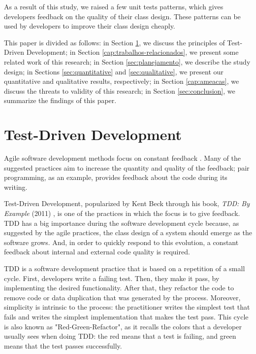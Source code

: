 \documentclass[times]{elsarticle}
\begin{document}
As a result of this study, we raised a few unit tests patterns, which gives developers
feedback on the quality of their class design. These patterns can be used by developers
to improve their class design cheaply.

This paper is divided as follows: in Section \ref{sec:tdd}, we discuss the principles
of Test-Driven Development; in Section \ref{cap:trabalhos-relacionados}, we present
some related work of this research; in Section \ref{sec:planejamento}, we describe the
study design; in Sections \ref{sec:quantitative} and \ref{sec:qualitative}, we present
our quantitative and qualitative results, respectively; in Section \ref{cap:ameacas},
we discuss the threats to validity of this research; in Section \ref{sec:conclusion},
we summarize the findings of this paper.


\section{Test-Driven Development}
\label{sec:tdd}

Agile software development methods focus on constant feedback \cite{AgileManifesto}. 
Many of the suggested practices
aim to increase the quantity and quality of the feedback; pair programming,
as an example, provides feedback about the code during its writing.

Test-Driven Development, popularized by Kent Beck through his book, \textit{TDD: By Example} (2011)
\cite{TDDByExample}, is one of the practices in which the focus is to give feedback. TDD has
a big importance during the software development cycle because, as suggested by the agile
practices, the class design of a system should emerge as the software grows. And, in order
to quickly respond to this evolution, a constant feedback about internal and external code
quality is required.

TDD is a software development practice that is based on a repetition of a small
cycle. First, developers write a failing test. Then, they make it pass,
by implementing the desired functionality. After that, they refactor the code
to remove code or data duplication that was generated by the process. Moreover,
simplicity is intrinsic to the process: the practitioner writes the simplest
test that fails and writes the simplest implementation that makes the
test pass. This cycle is also known as "Red-Green-Refactor", as it recalls the
colors that a developer usually sees when doing TDD: the red means that a test
is failing, and green means that the test passes successfully.
\end{document}
